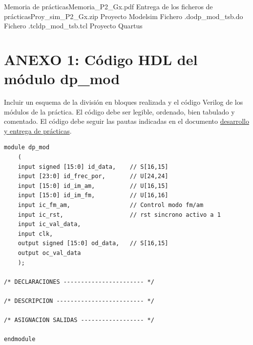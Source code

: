 \documentclass[parskip,a4paper,12pt]{article}
\newcommand{\fila}{}
\begin{document}
\begin{table}[H]
    \centering
    \label{tab:entregables}
\gdef\cabecera{\fila{FICHERO}{NOMBRE}}
\noindent\begin{mitabla}
\fila{Memoria de prácticas}{Memoria\_P2\_Gx.pdf}
\fila{Entrega de los ficheros de prácticas}{Proy\_sim\_P2\_Gx.zip}
\fila{Proyecto Modelsim}{}
\fila{Fichero .do}{dp\_mod\_tsb.do}
\fila{Fichero .tcl}{dp\_mod\_tsb.tcl}
\fila{Proyecto Quartus}{}
\end{mitabla}
\end{table}


\section{ANEXO 1: Código HDL del módulo dp\_mod}

\begin{enunciado}{}{}%
Incluir un esquema de la división en bloques realizada y el código Verilog de los módulos de la práctica. El código debe ser legible, ordenado, bien tabulado y comentado. El código debe seguir las pautas indicadas en el documento  \href{https://gised.webs.upv.es/pds_fpga/PDS_FPGA_practicas.pdf} {desarrollo y entrega de prácticas}. 
\end{enunciado}

\begin{verbatim}
module dp_mod
	(
	input signed [15:0] id_data,	// S[16,15] 
	input [23:0] id_frec_por,		// U[24,24]
	input [15:0] id_im_am,			// U[16,15]
	input [15:0] id_im_fm,			// U[16,16]
	input ic_fm_am, 				// Control modo fm/am
	input ic_rst,					// rst sincrono activo a 1
	input ic_val_data,				
	input clk,
	output signed [15:0] od_data,	// S[16,15]
	output oc_val_data
	);
	
/* DECLARACIONES ----------------------- */

/* DESCRIPCION ------------------------- */	

/* ASIGNACION SALIDAS ------------------ */

endmodule 
\end{verbatim}
\end{document}

